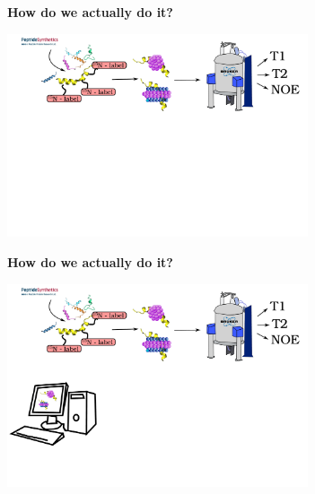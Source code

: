 \documentclass{beamer}
\begin{document}
\addtocounter{framenumber}{-1}
\begin{frame}
\begin{center}
\Large{\centering
\textbf{How do we actually do it?} \\}

\vspace{0.5cm}

\includegraphics[height=6cm]{what_we_do6.pdf}
\end{center}
\end{frame}


\addtocounter{framenumber}{-1}
\begin{frame}
\begin{center}
\Large{\centering
\textbf{How do we actually do it?} \\}

\vspace{0.5cm}

\includegraphics[height=6cm]{what_we_do5.pdf}
\end{center}
\end{frame}
\end{document}
